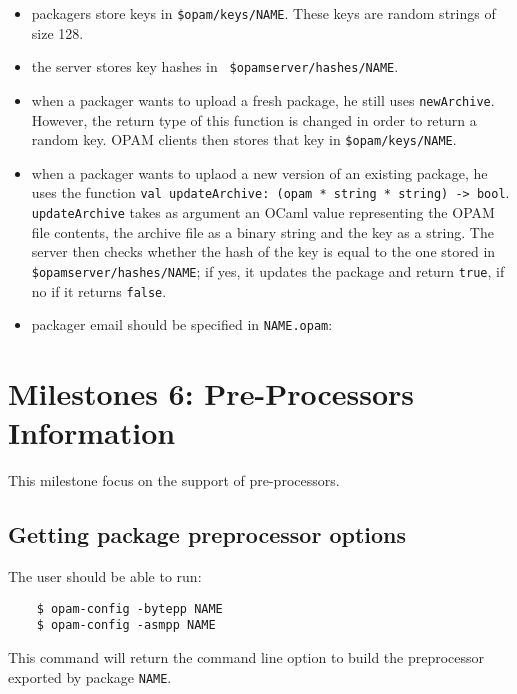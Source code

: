 \documentclass[a4paper,11pt]{article}
\begin{document}
\begin{itemize}
\begin{itemize}

\item packagers store keys in {\tt \$opam/keys/NAME}. These keys are
  random strings of size 128.

\item the server stores key hashes in {\tt
  \$opamserver/hashes/NAME}.

\item when a packager wants to upload a fresh package, he still uses
  {\tt newArchive}. However, the return type of this function is
  changed in order to return a random key. OPAM clients then stores
  that key in {\tt \$opam/keys/NAME}.

\item when a packager wants to uplaod a new version of an existing
  package, he uses the function {\tt val updateArchive: (opam * string
    * string) -> bool}. {\tt updateArchive} takes as argument an OCaml
  value representing the OPAM file contents, the archive file as a
  binary string and the key as a string. The server then checks
  whether the hash of the key is equal to the one stored in {\tt
    \$opamserver/hashes/NAME}; if yes, it updates the
  package and return {\tt true}, if no if it returns {\tt false}.

\item packager email should be specified in {\tt NAME.opam}:

\end{itemize}

\section{Milestones 6: Pre-Processors Information}

This milestone focus on the support of pre-processors.

\subsection{Getting package preprocessor options}

The user should be able to run:

\begin{verbatim}
    $ opam-config -bytepp NAME
    $ opam-config -asmpp NAME
\end{verbatim}

This command will return the command line option to build the
preprocessor exported by package {\tt NAME}.


\end{itemize}
\end{document}
